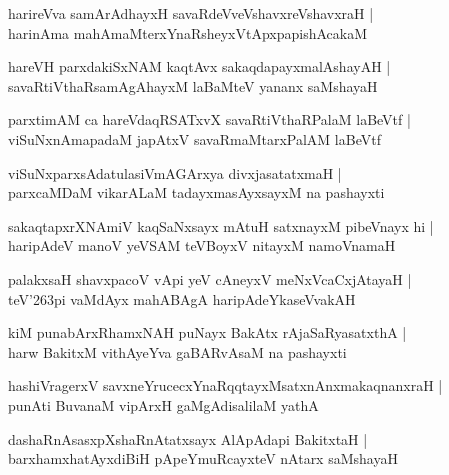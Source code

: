 \documentclass[twoside,12pt,openright]{book}
\def\S{\char'263}
\newcounter{shloka}[chapter]
\begin{document}
\begin{shloka}
harireVva samArAdhayxH savaRdeVveVshavxreVshavxraH |\\
harinAma mahAmaMterxYnaRsheyxVtApxpapishAcakaM 
\end{shloka}

\begin{shloka}
hareVH parxdakiSxNAM kaqtAvx sakaqdapayxmalAshayAH |\\
savaRtiVthaRsamAgAhayxM laBaMteV yananx saMshayaH
\end{shloka}

\begin{shloka}
parxtimAM ca hareVdaqRSATxvX savaRtiVthaRPalaM laBeVtf |\\
viSuNxnAmapadaM japAtxV savaRmaMtarxPalAM laBeVtf
\end{shloka}
 
\begin{shloka}
viSuNxparxsAdatulasiVmAGArxya divxjasatatxmaH |\\
parxcaMDaM vikarALaM tadayxmasAyxsayxM na pashayxti
\end{shloka}

\begin{shloka}
sakaqtapxrXNAmiV kaqSaNxsayx mAtuH satxnayxM pibeVnayx hi |\\
haripAdeV manoV yeVSAM teVBoyxV nitayxM namoVnamaH 
\end{shloka}

\begin{shloka}
palakxsaH shavxpacoV vApi yeV cAneyxV meNxVcaCxjAtayaH |\\
teV\S pi vaMdAyx mahABAgA haripAdeYkaseVvakAH 
\end{shloka}

\begin{shloka}
kiM punabArxRhamxNAH puNayx BakAtx rAjaSaRyasatxthA |\\
harw BakitxM vithAyeYva gaBARvAsaM na pashayxti 
\end{shloka}

\begin{shloka}
hashiVragerxV savxneYrucecxYnaRqqtayxMsatxnAnxmakaqnanxraH |\\
punAti BuvanaM vipArxH gaMgAdisalilaM yathA 
\end{shloka}

\begin{shloka}
dashaRnAsasxpXshaRnAtatxsayx AlApAdapi BakitxtaH |\\
barxhamxhatAyxdiBiH pApeYmuRcayxteV nAtarx saMshayaH  
\end{shloka}
\end{document}
